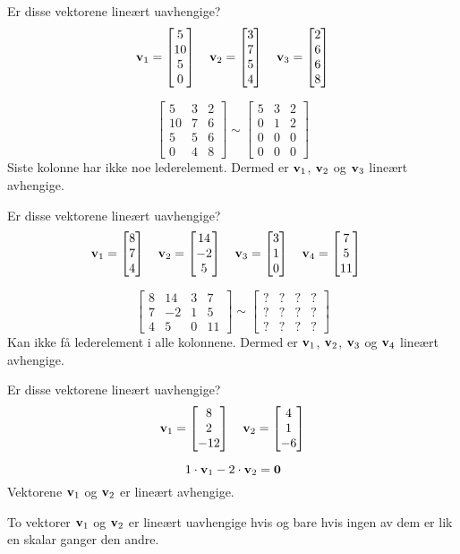 \begin{ex}
Er disse vektorene lineært uavhengige?
\[
\mathbf{v}_1 = \begin{bmatrix} 5 \\ 10 \\ 5 \\ 0 \end{bmatrix}\quad
\mathbf{v}_2 = \begin{bmatrix} 3 \\ 7 \\ 5 \\ 4 \end{bmatrix}\quad
\mathbf{v}_3 = \begin{bmatrix} 2 \\ 6 \\ 6 \\ 8 \end{bmatrix}
\]

\[
\begin{bmatrix}
5 & 3 & 2 \\
10 & 7 & 6 \\
5 & 5 & 6 \\
0 & 4 & 8
\end{bmatrix}
\sim
\begin{bmatrix}
5 & 3 & 2 \\
0 & 1 & 2 \\
0 & 0 & 0 \\
0 & 0 & 0
\end{bmatrix}
\]
Siste kolonne har ikke noe lederelement.  Dermed er $\mathbf{v}_1$,
$\mathbf{v}_2$ og $\mathbf{v}_3$ lineært avhengige.
\end{ex}


\begin{ex}
Er disse vektorene lineært uavhengige?
\[
\mathbf{v}_1 = \begin{bmatrix} 8 \\ 7 \\ 4 \end{bmatrix}\quad
\mathbf{v}_2 = \begin{bmatrix} 14 \\ -2 \\ 5 \end{bmatrix}\quad
\mathbf{v}_3 = \begin{bmatrix} 3 \\ 1 \\ 0 \end{bmatrix}\quad
\mathbf{v}_4 = \begin{bmatrix} 7 \\ 5 \\ 11 \end{bmatrix}\quad
\]

\[
\begin{bmatrix}
8 & 14 & 3 & 7 \\
7 & -2 & 1 & 5 \\
4 & 5 & 0 & 11
\end{bmatrix}
\sim
\begin{bmatrix}
? & ? & ? & ? \\
? & ? & ? & ? \\
? & ? & ? & ?
\end{bmatrix}
\]
Kan ikke få lederelement i alle kolonnene.  Dermed er
$\mathbf{v}_1$, $\mathbf{v}_2$, $\mathbf{v}_3$ og $\mathbf{v}_4$ lineært avhengige.
\end{ex}


\begin{ex}
Er disse vektorene lineært uavhengige?
\[
\mathbf{v}_1 = \begin{bmatrix} 8 \\ 2 \\ -12 \end{bmatrix}\quad
\mathbf{v}_2 = \begin{bmatrix} 4 \\ 1 \\ -6 \end{bmatrix}
\]

\[
1 \cdot \mathbf{v}_1 - 2 \cdot \mathbf{v}_2 = \mathbf{0}
\]
Vektorene $\mathbf{v}_1$ og $\mathbf{v}_2$ er lineært avhengige.
\end{ex}



\begin{thm}
To vektorer $\mathbf{v}_1$ og $\mathbf{v}_2$ er lineært uavhengige hvis og bare
hvis ingen av dem er lik en skalar ganger den andre.
\end{thm}

